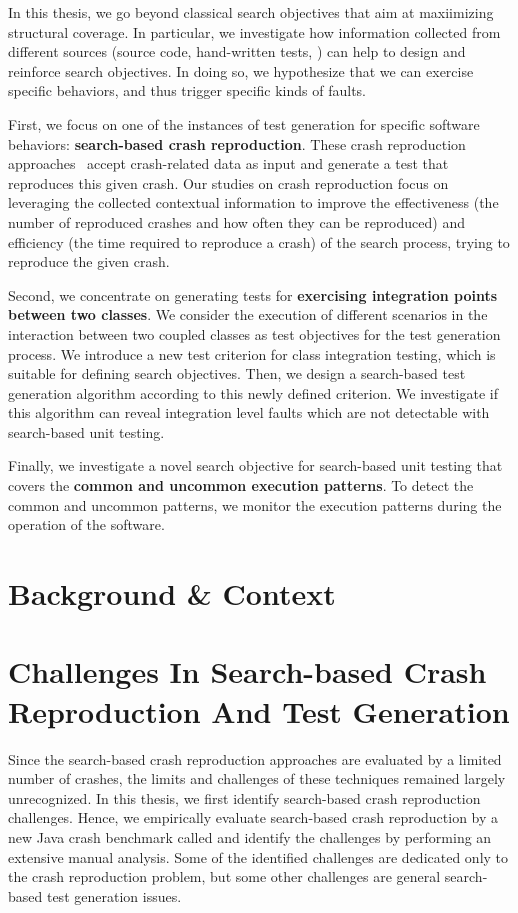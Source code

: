 \begin{framed}
In this thesis, we go beyond classical search objectives that aim at maxiimizing structural coverage. In particular, we investigate how information collected from different sources (\ie source code, hand-written tests, \etc) can help to design and reinforce search objectives. In doing so, we hypothesize that we can exercise specific behaviors, and thus trigger specific kinds of faults.
\end{framed}

First, we focus on one of the instances of test generation for specific software behaviors: \textbf{search-based crash reproduction}. These crash reproduction approaches~\cite{Soltani2018a, BPT17concrash, Chen2015, Nayrolles2017, Rossler2013, Xuan2015} accept crash-related data as input and generate a test that reproduces this given crash. Our studies on crash reproduction focus on leveraging the collected contextual information to improve the effectiveness (\ie the number of reproduced crashes and how often they can be reproduced) and efficiency (\ie the time required to reproduce a crash) of the search process, trying to reproduce the given crash.

Second, we concentrate on generating tests for \textbf{exercising integration points between two classes}. We consider the execution of different scenarios in the interaction between two coupled classes as test objectives for the test generation process. We introduce a new test criterion for class integration testing, which is suitable for defining search objectives. Then, we design a search-based test generation algorithm according to this newly defined criterion. We investigate if this algorithm can reveal integration level faults which are not detectable with search-based unit testing.

Finally, we investigate a novel search objective for search-based unit testing that covers the \textbf{common and uncommon execution patterns}. To detect the common and uncommon patterns, we monitor the execution patterns during the operation of the software.

\section{Background \& Context}


\section{Challenges In Search-based Crash Reproduction And Test Generation}
Since the search-based crash reproduction approaches are evaluated by a limited number of crashes, the limits and challenges of these techniques remained largely unrecognized.
In this thesis, we first identify search-based crash reproduction challenges. Hence, we empirically evaluate search-based crash reproduction by a new Java crash benchmark called \jcrashpack and identify the challenges by performing an extensive manual analysis. Some of the identified challenges are dedicated only to the crash reproduction problem, but some other challenges are general search-based test generation issues.

